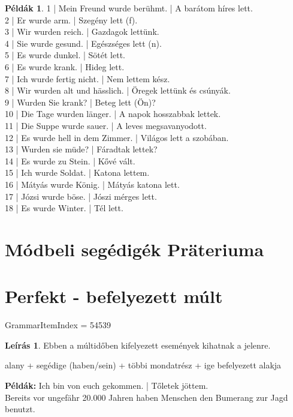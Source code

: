\documentclass{article}
\theoremstyle{definition}
\newtheorem*{exmp}{Példák}
\newtheorem*{desc}{Leírás}
\begin{document}
\begin{exmp}
1 | Mein Freund wurde berühmt. | A barátom híres lett.\\
2 | Er wurde arm. | Szegény lett (f).\\
3 | Wir wurden reich. | Gazdagok lettünk.\\
4 | Sie wurde gesund. | Egészséges lett (n).\\
5 | Es wurde dunkel. | Sötét lett.\\
6 | Es wurde krank. | Hideg lett.\\
7 | Ich wurde fertig nicht. | Nem lettem kész.\\
8 | Wir wurden alt und hässlich. | Öregek lettünk és csúnyák.\\
9 | Wurden Sie krank? | Beteg lett (Ön)?\\
10 | Die Tage wurden länger. |  A napok hosszabbak lettek.\\
11 | Die Suppe wurde sauer. | A leves megsavanyodott.\\
12 | Es wurde hell in dem Zimmer. | Világos lett a szobában.\\
13 | Wurden sie müde? | Fáradtak lettek?\\
14 | Es wurde zu Stein. | Kővé vált.\\
15 | Ich wurde Soldat. | Katona lettem.\\
16 | Mátyás wurde König. | Mátyás katona lett.\\
17 | Józsi wurde böse. | Jószi mérges lett.\\
18 | Es wurde Winter. | Tél lett.\\
\end{exmp}

\section{Módbeli segédigék Präteriuma}

\section{Perfekt - befelyezett múlt}

GrammarItemIndex = 54539

\begin{desc}
Ebben a múltidőben kifelyezett események kihatnak a jelenre.
\begin{center}
alany + segédige (haben/sein) + többi mondatrész + ige befelyezett alakja
\end{center}

\textbf{Példák:} Ich bin von euch gekommen. | Tőletek jöttem.\\
Bereits vor ungefähr 20.000 Jahren haben Menschen den Bumerang zur Jagd benutzt.
\end{desc}
\end{document}
